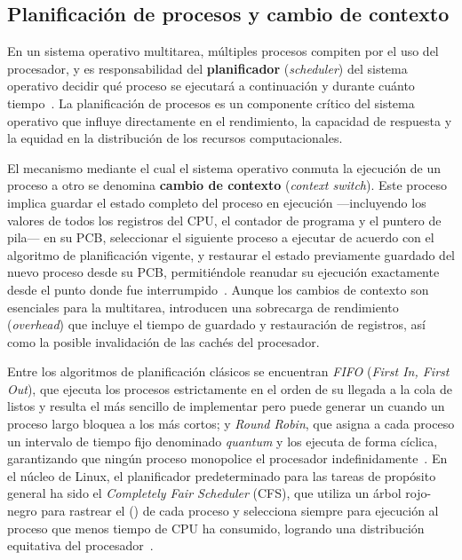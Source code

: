 \subsection{Planificación de procesos y cambio de contexto}
\label{subsec:planificacion}

En un sistema operativo multitarea, múltiples procesos compiten por el uso del procesador, y es responsabilidad del \textbf{planificador} (\textit{scheduler}) del sistema operativo decidir qué proceso se ejecutará a continuación y durante cuánto tiempo~\cite{silberschatz2018}. La planificación de procesos es un componente crítico del sistema operativo que influye directamente en el rendimiento, la capacidad de respuesta y la equidad en la distribución de los recursos computacionales.

El mecanismo mediante el cual el sistema operativo conmuta la ejecución de un proceso a otro se denomina \textbf{cambio de contexto} (\textit{context switch}). Este proceso implica guardar el estado completo del proceso en ejecución ---incluyendo los valores de todos los registros del CPU, el contador de programa y el puntero de pila--- en su PCB, seleccionar el siguiente proceso a ejecutar de acuerdo con el algoritmo de planificación vigente, y restaurar el estado previamente guardado del nuevo proceso desde su PCB, permitiéndole reanudar su ejecución exactamente desde el punto donde fue interrumpido~\cite{tanenbaum2015}. Aunque los cambios de contexto son esenciales para la multitarea, introducen una sobrecarga de rendimiento (\textit{overhead}) que incluye el tiempo de guardado y restauración de registros, así como la posible invalidación de las cachés del procesador.

Entre los algoritmos de planificación clásicos se encuentran \textit{FIFO} (\textit{First In, First Out}), que ejecuta los procesos estrictamente en el orden de su llegada a la cola de listos y resulta el más sencillo de implementar pero puede generar un  cuando un proceso largo bloquea a los más cortos; y \textit{Round Robin}, que asigna a cada proceso un intervalo de tiempo fijo denominado \textit{quantum} y los ejecuta de forma cíclica, garantizando que ningún proceso monopolice el procesador indefinidamente~\cite{silberschatz2018}. En el núcleo de Linux, el planificador predeterminado para las tareas de propósito general ha sido el \textit{Completely Fair Scheduler} (CFS), que utiliza un árbol rojo-negro para rastrear el  () de cada proceso y selecciona siempre para ejecución al proceso que menos tiempo de CPU ha consumido, logrando una distribución equitativa del procesador~\cite{love2013}.

